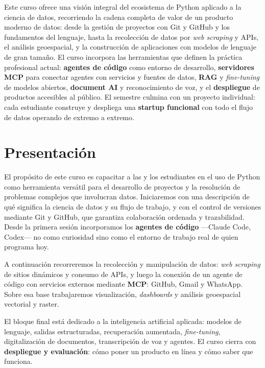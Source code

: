 \documentclass[11pt]{article}
\begin{document}
Este curso ofrece una visi\'on integral del ecosistema de Python aplicado a la ciencia de datos, recorriendo la cadena completa de valor de un producto moderno de datos: desde la gesti\'on de proyectos con Git y GitHub y los fundamentos del lenguaje, hasta la recolecci\'on de datos por \emph{web scraping} y APIs, el an\'alisis geoespacial, y la construcci\'on de aplicaciones con modelos de lenguaje de gran tama\~no. El curso incorpora las herramientas que definen la pr\'actica profesional actual: \textbf{agentes de c\'odigo} como entorno de desarrollo, \textbf{servidores MCP} para conectar agentes con servicios y fuentes de datos, \textbf{RAG} y \emph{fine-tuning} de modelos abiertos, \textbf{document AI} y reconocimiento de voz, y el \textbf{despliegue} de productos accesibles al p\'ublico. El semestre culmina con un proyecto individual: cada estudiante construye y despliega una \textbf{startup funcional} con todo el flujo de datos operando de extremo a extremo.

\section{Presentaci\'on}

El prop\'osito de este curso es capacitar a las y los estudiantes en el uso de Python como herramienta versátil para el desarrollo de proyectos y la resoluci\'on de problemas complejos que involucran datos. Iniciaremos con una descripci\'on de qu\'e significa la ciencia de datos y su flujo de trabajo, y con el control de versiones mediante Git y GitHub, que garantiza colaboraci\'on ordenada y trazabilidad. Desde la primera sesi\'on incorporamos los \textbf{agentes de c\'odigo} ---Claude Code, Codex--- no como curiosidad sino como el entorno de trabajo real de quien programa hoy.

A continuaci\'on recorreremos la recolecci\'on y manipulaci\'on de datos: \emph{web scraping} de sitios din\'amicos y consumo de APIs, y luego la conexi\'on de un agente de c\'odigo con servicios externos mediante \textbf{MCP}: GitHub, Gmail y WhatsApp. Sobre esa base trabajaremos visualizaci\'on, \emph{dashboards} y an\'alisis geoespacial vectorial y raster.

El bloque final est\'a dedicado a la inteligencia artificial aplicada: modelos de lenguaje, salidas estructuradas, recuperaci\'on aumentada, \emph{fine-tuning}, digitalizaci\'on de documentos, transcripci\'on de voz y agentes. El curso cierra con \textbf{despliegue y evaluaci\'on}: c\'omo poner un producto en l\'inea y c\'omo saber que funciona.
\end{document}
